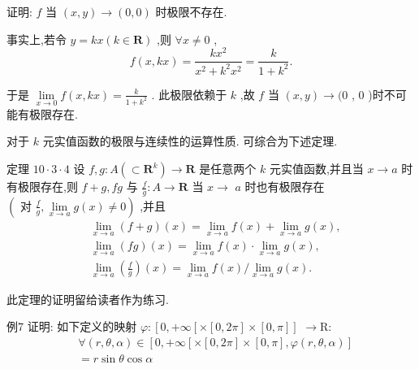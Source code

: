 证明: $f$ 当 $\left( {x,y}\right)  \rightarrow  \left( {0,0}\right)$ 时极限不存在.

事实上,若令 $y = {kx}\left( {k \in  \mathbf{R}}\right)$ ,则 $\forall x \neq  0$ ,
$$f\left( {x,{kx}}\right)  = \frac{k{x}^{2}}{{x}^{2} + {k}^{2}{x}^{2}} = \frac{k}{1 + {k}^{2}}.$$

于是 $\mathop{\lim }\limits_{{x \rightarrow  0}}f\left( {x,{kx}}\right)  = \frac{k}{1 + {k}^{2}}$ . 此极限依赖于 $k$ ,故 $f$ 当 $\left( {x,y}\right)  \rightarrow  (0$ , 0 )时不可能有极限存在.

对于 $k$ 元实值函数的极限与连续性的运算性质. 可综合为下述定理.

定理 ${10} \cdot  3 \cdot  4$ 设 $f,g : A\left( { \subset  {\mathbf{R}}^{k}}\right)  \rightarrow  \mathbf{R}$ 是任意两个 $k$ 元实值函数,并且当 $x \rightarrow  a$ 时有极限存在,则 $f + g,{fg}$ 与 $\frac{f}{g} : A \rightarrow  \mathbf{R}$ 当 $x \rightarrow$  $a$ 时也有极限存在 $\left( {\text{ 对 }\frac{f}{g},\mathop{\lim }\limits_{{x \rightarrow  a}}g\left( x\right)  \neq  0}\right)$ ,并且
\begin{align*}
	&\mathop{\lim }\limits_{{x \rightarrow  a}}\left( {f + g}\right) \left( x\right)  = \mathop{\lim }\limits_{{x \rightarrow  a}}f\left( x\right)  + \mathop{\lim }\limits_{{x \rightarrow  a}}g\left( x\right) ,\\
	&\mathop{\lim }\limits_{{x \rightarrow  a}}\left( {fg}\right) \left( x\right)  = \mathop{\lim }\limits_{{x \rightarrow  a}}f\left( x\right)  \cdot  \mathop{\lim }\limits_{{x \rightarrow  a}}g\left( x\right) ,\\
	&\mathop{\lim }\limits_{{x \rightarrow  a}}\left( \frac{f}{g}\right) \left( x\right)  = \mathop{\lim }\limits_{{x \rightarrow  a}}f\left( x\right) /\mathop{\lim }\limits_{{x \rightarrow  a}}g\left( x\right) .
\end{align*}

此定理的证明留给读者作为练习.

例7 证明: 如下定义的映射 $\varphi  : \left\lbrack  {0, + \infty \left\lbrack  {\times \left\lbrack  {0,{2\pi }}\right\rbrack   \times  \left\lbrack  {0,\pi }\right\rbrack  }\right\rbrack  }\right.$  $\rightarrow  \mathrm{R} :$
\begin{align*}
	&\forall \left( {r,\theta ,\alpha }\right)  \in  \left\lbrack  {0, + \infty \left\lbrack  {\times \left\lbrack  {0,{2\pi }}\right\rbrack   \times  \left\lbrack  {0,\pi }\right\rbrack  ,\varphi \left( {r,\theta ,\alpha }\right) }\right\rbrack  }\right.\\
	&= r\sin \theta \cos \alpha
\end{align*}

